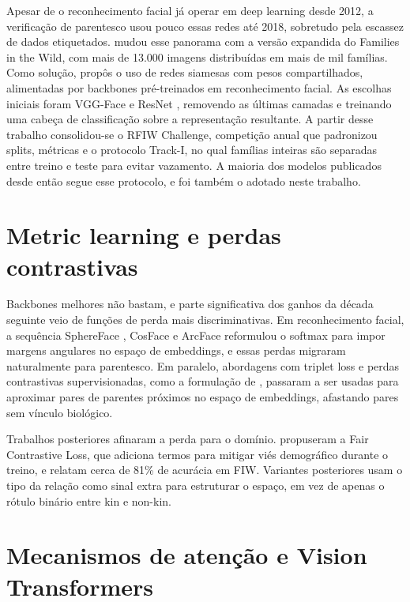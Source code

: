 Apesar de o reconhecimento facial já operar em deep learning desde 2012, a verificação de parentesco usou pouco essas redes até 2018, sobretudo pela escassez de dados etiquetados.  mudou esse panorama com a versão expandida do Families in the Wild, com mais de 13.000 imagens distribuídas em mais de mil famílias. Como solução, propôs o uso de redes siamesas com pesos compartilhados, alimentadas por backbones pré-treinados em reconhecimento facial. As escolhas iniciais foram VGG-Face \cite{parkhi2015deep} e ResNet \cite{wen2016discriminative}, removendo as últimas camadas e treinando uma cabeça de classificação sobre a representação resultante. A partir desse trabalho consolidou-se o RFIW Challenge,
competição anual que padronizou splits, métricas e o protocolo Track-I, no qual famílias inteiras são separadas entre treino e teste para evitar vazamento. A maioria dos modelos publicados desde então segue esse protocolo, e foi também o adotado neste trabalho.

\section{Metric learning e perdas contrastivas}

Backbones melhores não bastam, e parte significativa dos ganhos da década seguinte veio de funções de perda mais discriminativas. Em reconhecimento facial, a sequência SphereFace \cite{liu2017sphereface},
CosFace \cite{wang2018cosface}
e ArcFace \cite{deng2019arcface}
reformulou o softmax para impor margens angulares no espaço de embeddings, e essas perdas migraram naturalmente para parentesco. Em paralelo, abordagens com triplet loss \cite{schroff2015facenet}
e perdas contrastivas supervisionadas, como a formulação de ,
passaram a ser usadas para aproximar pares de parentes próximos no espaço de embeddings, afastando pares sem vínculo biológico.

Trabalhos posteriores afinaram a perda para o domínio. 
propuseram a Fair Contrastive Loss, que adiciona termos para mitigar viés demográfico durante o treino, e relatam cerca de 81\% de acurácia em FIW. Variantes posteriores usam o tipo da relação como sinal extra para estruturar o espaço, em vez de apenas o rótulo binário entre kin e non-kin.

\section{Mecanismos de atenção e Vision Transformers}

